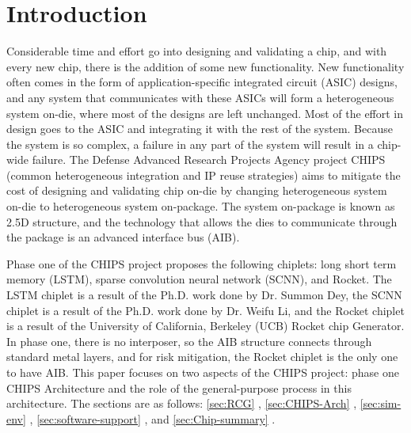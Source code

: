 \documentclass[../main.tex]{subfiles}
\begin{document}
\section{Introduction}
Considerable time and effort go into designing and validating a chip, and with every new chip, there is the addition of some new functionality. New functionality often comes in the form of application-specific integrated circuit (ASIC) designs, and any system that communicates with these ASICs will form a heterogeneous system on-die, where most of the designs are left unchanged. Most of the effort in design goes to the ASIC and integrating it with the rest of the system. Because the system is so complex, a failure in any part of the system will result in a chip-wide failure. The Defense Advanced Research Projects Agency project CHIPS (common heterogeneous integration and IP reuse strategies) aims to mitigate the cost of designing and validating chip on-die by changing heterogeneous system on-die to heterogeneous system on-package. The system on-package is known as 2.5D structure, and the technology that allows the dies to communicate through the package is an advanced interface bus (AIB). 

Phase one of the CHIPS project proposes the following chiplets: long short term memory (LSTM), sparse convolution neural network (SCNN), and Rocket. The LSTM chiplet is a result of the Ph.D. work done by Dr. Summon Dey, the SCNN chiplet is a result of the Ph.D. work done by Dr. Weifu Li, and the Rocket chiplet is a result of the University of California, Berkeley (UCB) Rocket chip Generator. In phase one, there is no interposer, so the AIB structure connects through standard metal layers, and for risk mitigation, the Rocket chiplet is the only one to have AIB. This paper focuses on two aspects of the CHIPS project: phase one CHIPS Architecture and the role of the general-purpose process in this architecture. The sections are as follows: \ref{sec:RCG} , \ref{sec:CHIPS-Arch} , \ref{sec:sim-env} , \ref{sec:software-support} , and \ref{sec:Chip-summary} .
\end{document}
